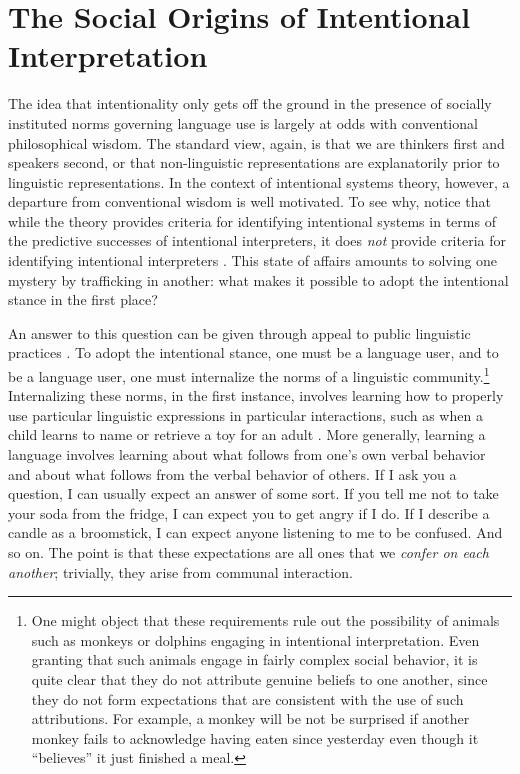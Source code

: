 \section{The Social Origins of Intentional Interpretation}

The idea that intentionality only gets off the ground in the presence of socially instituted norms governing language use is largely at odds with conventional philosophical wisdom. The standard view, again, is that we are thinkers first and speakers second, or that non-linguistic representations are explanatorily prior to linguistic representations. In the context of intentional systems theory, however, a departure from conventional wisdom is well motivated. To see why, notice that while the theory provides criteria for identifying intentional systems in terms of the predictive successes of intentional interpreters, it does \textit{not} provide criteria for identifying intentional interpreters \citep[][p. 57-59]{Brandom:1994}. This state of affairs amounts to solving one mystery by trafficking in another: what makes it possible to adopt the intentional stance in the first place?

An answer to this question can be given through appeal to public linguistic practices \citep{Brandom:1994}. To adopt the intentional stance, one must be a language user, and to be a language user, one must internalize the norms of a linguistic community.\footnote{One might object that these requirements rule out the possibility of animals such as monkeys or dolphins engaging in intentional interpretation. Even granting that such animals engage in fairly complex social behavior, it is quite clear that they do not attribute genuine beliefs to one another, since they do not form expectations that are consistent with the use of such attributions. For example, a monkey will be not be surprised if another monkey fails to acknowledge having eaten since yesterday even though it ``believes'' it just finished a meal.} Internalizing these norms, in the first instance, involves learning how to properly use particular linguistic expressions in particular interactions, such as when a child learns to name or retrieve a toy for an adult \citep[][]{Tomasello:2005}. More generally, learning a language involves learning about what follows from one's own verbal behavior and about what follows from the verbal behavior of others. If I ask you a question, I can usually expect an answer of some sort. If you tell me not to take your soda from the fridge, I can expect you to get angry if I do. If I describe a candle as a broomstick, I can expect anyone listening to me to be confused. And so on. The point is that these expectations are all ones that we \textit{confer on each another}; trivially, they arise from communal interaction.


